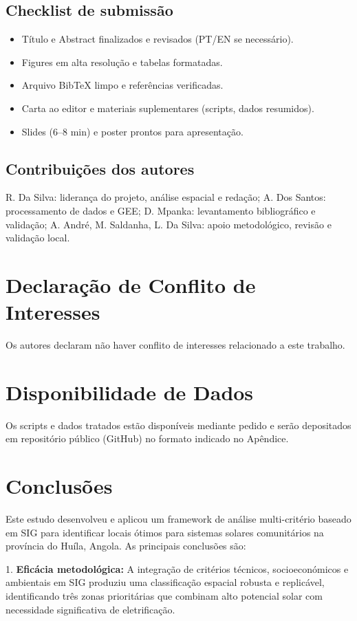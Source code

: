 \documentclass[12pt, a4paper]{article}
\begin{document}
\subsection{Checklist de submissão}
\begin{itemize}
    \item Título e Abstract finalizados e revisados (PT/EN se necessário).
    \item Figures em alta resolução e tabelas formatadas.
    \item Arquivo BibTeX limpo e referências verificadas.
    \item Carta ao editor e materiais suplementares (scripts, dados resumidos).
    \item Slides (6–8 min) e poster prontos para apresentação.
\end{itemize}

\subsection{Contribuições dos autores}
R. Da Silva: liderança do projeto, análise espacial e redação; A. Dos Santos: processamento de dados e GEE; D. Mpanka: levantamento bibliográfico e validação; A. André, M. Saldanha, L. Da Silva: apoio metodológico, revisão e validação local.

\section*{Declaração de Conflito de Interesses}
Os autores declaram não haver conflito de interesses relacionado a este trabalho.

\section*{Disponibilidade de Dados}
Os scripts e dados tratados estão disponíveis mediante pedido e serão depositados em repositório público (GitHub) no formato indicado no Apêndice.

\section{Conclusões}

Este estudo desenvolveu e aplicou um framework de análise multi-critério baseado em SIG para identificar locais ótimos para sistemas solares comunitários na província do Huíla, Angola. As principais conclusões são:

1. \textbf{Eficácia metodológica:} A integração de critérios técnicos, socioeconómicos e ambientais em SIG produziu uma classificação espacial robusta e replicável, identificando três zonas prioritárias que combinam alto potencial solar com necessidade significativa de eletrificação.
\end{document}
